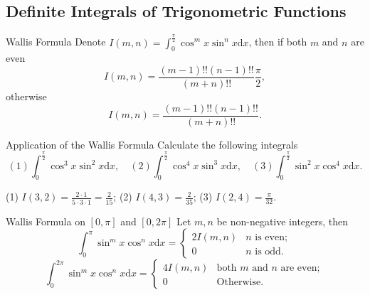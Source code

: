 \subsection{Definite Integrals of Trigonometric Functions}

\begin{theorem}{Wallis Formula}{}
  Denote $I(m, n) = \int_0^{\frac{\pi}{2}} \cos ^m x \sin^n x\mathrm{d}x$,
  then if both $m$ and $n$ are even
  \begin{equation}
    I(m, n) = \frac{(m-1)!! (n-1)!!}{(m+n)!!} \frac{\pi}{2},
  \end{equation}
  otherwise
  \begin{equation}
    I(m, n) = \frac{(m-1)!! (n-1)!!}{(m+n)!!}.
  \end{equation}
\end{theorem}

\begin{example}{Application of the Wallis Formula}{}
  Calculate the following integrals
  \begin{equation}
    (1) \int_0^{\frac{\pi}{2}} \cos^3 x \sin^2 x \mathrm{d} x, \quad
    (2) \int_0^{\frac{\pi}{2}} \cos^4 x \sin^3 x \mathrm{d} x, \quad
    (3) \int_0^{\frac{\pi}{2}} \sin^2 x \cos^4 x \mathrm{d} x.
  \end{equation}
\end{example}

\begin{solution}
  (1) $I(3, 2) = \frac{2 \cdot 1}{5 \cdot 3 \cdot 1} = \frac{2}{15}$;
  (2) $I(4, 3) = \frac{2}{35}$;
  (3) $I(2, 4) = \frac{\pi}{32}$.
\end{solution}

\begin{corollary}{Wallis Formula on $[0, \pi]$ and $[0, 2\pi]$}{}
  Let $m, n$ be non-negative integers, then
  \begin{equation}
    \int_0^{\pi} \sin^m x \cos^n x \mathrm{d} x =
    \begin{cases}
      2I(m, n) & \text{$n$ is even};\\
      0 & \text{$n$ is odd}.
    \end{cases}
  \end{equation}
  \begin{equation}
    \int_0^{2\pi} \sin^m x \cos^n x \mathrm{d} x =
    \begin{cases}
      4I(m, n) & \text{both $m$ and $n$ are even};\\
      0 & \text{Otherwise}.
    \end{cases}
  \end{equation}
\end{corollary}


